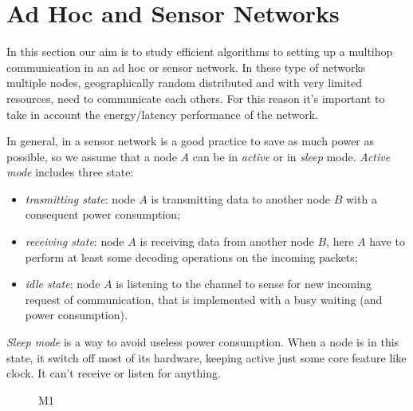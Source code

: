 \chapter{Ad Hoc and Sensor Networks}
In this section our aim is to study efficient algorithms to setting up a multihop communication in an ad hoc or sensor network.
In these type of networks multiple nodes, geographically random distributed and with very limited resources, need to communicate each others. For this reason it's important to take in account the energy/latency performance of the network.

In general, in a sensor network is a good practice to save as much power as possible, so we assume that a node $A$ can be in \textit{active} or in \textit{sleep} mode.
\textit{Active mode} includes three state:
\begin{itemize}
	\item \textit{trasmitting state}: node $A$ is transmitting data to another node $B$ with a consequent power consumption;
	\item \textit{receiving state}: node $A$ is receiving data from another node $B$, here $A$ have to perform at least some decoding operations on the incoming packets;
	\item \textit{idle state}: node $A$ is listening to the channel to sense for new incoming request of communication, that is implemented with a busy waiting (and power consumption).
\end{itemize}

\textit{Sleep mode} is a way to avoid useless power consumption. When a node is in this state, it switch off most of its hardware, keeping active just some core feature like clock. It can't receive or listen for anything.
\begin{figure}[h]
\centering
{}
\caption{M1} \label{fig:powervar}
\end{figure}


